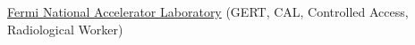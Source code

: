 \href{http://www.fnal.gov/}{Fermi National Accelerator Laboratory} (GERT, CAL, Controlled Access, Radiological Worker)